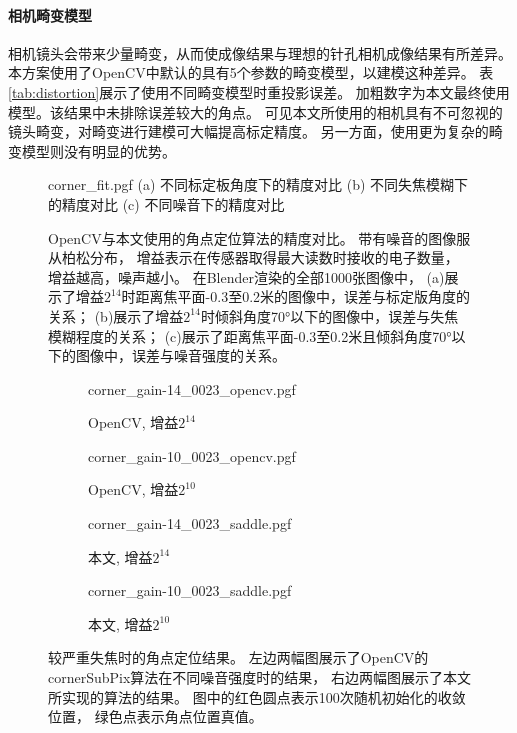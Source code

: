 \paragraph{相机畸变模型}
相机镜头会带来少量畸变，从而使成像结果与理想的针孔相机成像结果有所差异。
本方案使用了OpenCV中默认的具有5个参数的畸变模型，以建模这种差异。
表\ref{tab:distortion}展示了使用不同畸变模型时重投影误差。
加粗数字为本文最终使用模型。该结果中未排除误差较大的角点。
可见本文所使用的相机具有不可忽视的镜头畸变，对畸变进行建模可大幅提高标定精度。
另一方面，使用更为复杂的畸变模型则没有明显的优势。

\begin{figure}
    \centering
    {corner_fit.pgf}
    \small
    (a) 不同标定板角度下的精度对比\hfill
    (b) 不同失焦模糊下的精度对比\hfill
    (c) 不同噪音下的精度对比
    \caption[OpenCV与本文使用的角点定位算法的精度对比]{
        OpenCV与本文使用的角点定位算法的精度对比。
        带有噪音的图像服从柏松分布，
        增益表示在传感器取得最大读数时接收的电子数量，增益越高，噪声越小。
        在Blender渲染的全部1000张图像中，
        (a)展示了增益$2^{14}$时距离焦平面-0.3至0.2米的图像中，误差与标定版角度的关系；
        (b)展示了增益$2^{14}$时倾斜角度70°以下的图像中，误差与失焦模糊程度的关系；
        (c)展示了距离焦平面-0.3至0.2米且倾斜角度70°以下的图像中，误差与噪音强度的关系。
    }
    \label{fig:corner_fit}
\end{figure}

\begin{figure}
    \centering
    \begin{subfigure}{1.57in}
        {corner_gain-14_0023_opencv.pgf}%
        \caption{OpenCV, 增益$2^{14}$}%
    \end{subfigure}%
    \begin{subfigure}{1.57in}
        {corner_gain-10_0023_opencv.pgf}%
        \caption{OpenCV, 增益$2^{10}$}%
    \end{subfigure}%
    \begin{subfigure}{1.57in}
        {corner_gain-14_0023_saddle.pgf}%
        \caption{本文, 增益$2^{14}$}%
    \end{subfigure}%
    \begin{subfigure}{1.57in}
        {corner_gain-10_0023_saddle.pgf}%
        \caption{本文, 增益$2^{10}$}%
    \end{subfigure}%
    \caption[较严重失焦时的角点定位结果]{
        较严重失焦时的角点定位结果。
        左边两幅图展示了OpenCV的cornerSubPix算法在不同噪音强度时的结果，
        右边两幅图展示了本文所实现的算法的结果。
        图中的红色圆点表示100次随机初始化的收敛位置，
        绿色点表示角点位置真值。
    }
    \label{fig:corner_blur}
\end{figure}

